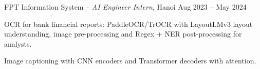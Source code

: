 \begin{cventries}
\vspace{8pt}

  \cventry
    {FPT Information System -- \textnormal{\textit{AI Engineer Intern}, Hanoi}}
    {Aug 2023 -- May 2024}
    {
      \begin{cvitems}
        \item {OCR for bank financial reports: PaddleOCR/TrOCR with LayoutLMv3 layout understanding, image pre-processing and Regex + NER post-processing for analysts.}
        \item {Image captioning with CNN encoders and Transformer decoders with attention.}
      \end{cvitems}
    }
\end{cventries}

\vspace{10pt}
